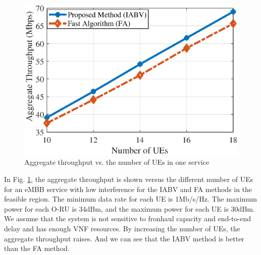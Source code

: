 \documentclass[lettersize,journal]{IEEEtran}
\begin{document}
\begin{figure}%
  \centering
    \includegraphics[scale = 0.5]{fig/FAn.eps}
  \caption{\small Aggregate throughput vs. the number of UEs in one service }
  \label{fig:14}

\end{figure}
In Fig. \ref{fig:14}, the aggregate throughput is shown versus
the different number of UEs for an eMBB service with low interference for the IABV and FA methods in the feasible region.
The minimum data rate for each UE is 1Mb/s/Hz.
The maximum power for each O-RU is 34dBm, and the maximum power for each UE is 30dBm. We assume that the system is not sensitive to fronhaul capacity and end-to-end delay and has enough VNF resources.
By increasing the number of UEs, the aggregate throughput raises.
And we can see that the IABV method is better than the FA method.
\vspace*{-1.em}
\end{document}
